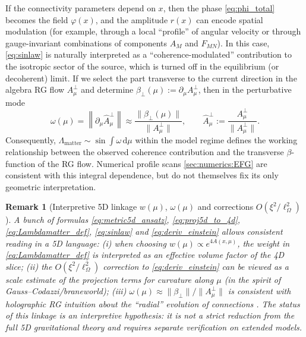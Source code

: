 \documentclass[11pt,a4paper]{article}
\newcommand{\dd}{\mathrm{d}}
\theoremstyle{definition}
\theoremstyle{plain}
\newtheorem{remark}{Remark}[section]
\theoremstyle{remark}
\begin{document}
If the connectivity parameters depend on $x$, then the phase \eqref{eq:phi_total} becomes the field $\varphi(x)$, and the amplitude $r(x)$
can encode spatial modulation (for example, through a local “profile” of angular velocity or through gauge-invariant
combinations of components $A_M$ and $F_{MN}$).
In this case, \eqref{eq:sinlaw} is naturally interpreted as a “coherence-modulated” contribution to the isotropic sector of the source,
which is turned off in the equilibrium (or decoherent) limit.
If we select the part transverse to the current direction in the algebra RG flow
$A_\mu^\perp$ and determine
$\beta_\perp(\mu):=\partial_\mu A_\mu^\perp$,
then in the perturbative mode
\[
\omega(\mu)=\left\|\partial_\mu\hat A_\mu^\perp\right\|
\approx
\frac{\|\beta_\perp(\mu)\|}{\|A_\mu^\perp\|},
\qquad
\hat A_\mu^\perp:=\frac{A_\mu^\perp}{\|A_\mu^\perp\|}.
\]
Consequently,
$\Lambda_{\mathrm{matter}}\sim\sin\!\int\omega\,\dd\mu$
within the model regime defines the working relationship between the observed coherence contribution
and the transverse $\beta$-function of the RG flow.
Numerical profile scans \cref{sec:numerics:EFG} are consistent with this integral dependence,
but do not themselves fix its only geometric interpretation.

\begin{remark}[Interpretive 5D linkage $w(\mu)$, $\omega(\mu)$ and corrections $O(\xi^2/\ell_\Omega^2)$]\label{rem:5d_bridge}
A bunch of formulas \eqref{eq:metric5d_ansatz}, \eqref{eq:proj5d_to_4d}, \eqref{eq:Lambdamatter_def},
\eqref{eq:sinlaw} and \eqref{eq:deriv_einstein} allows consistent reading in a 5D language:
(i) when choosing $w(\mu)\propto e^{4A(x,\mu)}$, the weight in \eqref{eq:Lambdamatter_def}
is interpreted as an effective volume factor of the 4D slice;
(ii) the $O(\xi^2/\ell_\Omega^2)$ correction to \eqref{eq:deriv_einstein} can be viewed as a
scale estimate of the projection terms for curvature along $\mu$ (in the spirit of Gauss--Codazzi/braneworld);
(iii) $\omega(\mu)\approx \|\beta_\perp\|/\|A_\mu^\perp\|$ is consistent with
holographic RG intuition about the “radial” evolution of connections
\cite{deBoerVerlindeVerlinde2000HolographicRG,RandallSundrum1999LargeHierarchy,RandallSundrum1999Alternative,Kim2020EmergentGeometryRG}.
The status of this linkage is an interpretive hypothesis:
it is not a strict reduction from the full 5D gravitational theory and requires separate
verification on extended models.
\end{remark}

\end{document}
